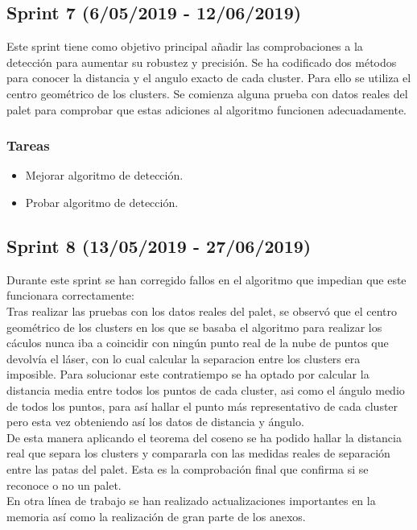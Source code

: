 

\subsection{Sprint 7 (6/05/2019 - 12/06/2019)}
Este sprint tiene como objetivo principal añadir las comprobaciones a la detección para aumentar su robustez y precisión. Se ha codificado dos métodos para conocer la distancia y el angulo exacto de cada cluster. Para ello se utiliza el centro geométrico de los clusters. Se comienza alguna prueba con datos reales del palet para comprobar que estas adiciones al algoritmo funcionen adecuadamente.




\subsubsection{Tareas}
\begin{itemize}
\item Mejorar algoritmo de detección.
\item Probar algoritmo de detección.


\end{itemize}



\subsection{Sprint 8 (13/05/2019 - 27/06/2019)}
Durante este sprint se han corregido fallos en el algoritmo que impedian que este funcionara correctamente:\\ Tras realizar las pruebas con los datos reales del palet, se observó que el centro geométrico de los clusters en los que se basaba el algoritmo para realizar los cáculos nunca iba a coincidir con ningún punto real de la nube de puntos que devolvía el láser, con lo cual calcular la separacion entre los clusters era imposible. Para solucionar este contratiempo se ha optado por calcular la distancia media entre todos los puntos de cada cluster, asi como el ángulo medio de todos los puntos, para así hallar el punto más representativo de cada cluster pero esta vez obteniendo así los datos de distancia y ángulo.\\ De esta manera aplicando el teorema del coseno se ha podido hallar la distancia real que separa los clusters y compararla con las medidas reales de separación entre las patas del palet. Esta es la comprobación final que confirma si se reconoce o no un palet.\\ En otra línea de trabajo se han realizado actualizaciones importantes en la memoria así como la realización de gran parte de los anexos.




